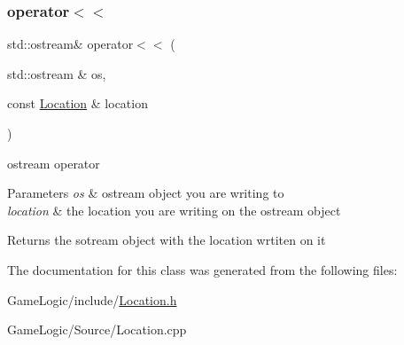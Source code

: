 \subsubsection{\texorpdfstring{operator$<$$<$}{operator<<}}
{\footnotesize\ttfamily std\+::ostream\& operator$<$$<$ (\begin{DoxyParamCaption}\item[{std\+::ostream \&}]{os,  }\item[{const \hyperlink{classroadfighter_1_1Location}{Location} \&}]{location }\end{DoxyParamCaption})\hspace{0.3cm}{\ttfamily [friend]}}

ostream operator 
\begin{DoxyParams}{Parameters}
{\em os} & ostream object you are writing to \\
\hline
{\em location} & the location you are writing on the ostream object \\
\hline
\end{DoxyParams}
\begin{DoxyReturn}{Returns}
the sotream object with the location wrtiten on it 
\end{DoxyReturn}


The documentation for this class was generated from the following files\+:\begin{DoxyCompactItemize}
\item 
Game\+Logic/include/\hyperlink{Location_8h}{Location.\+h}\item 
Game\+Logic/\+Source/Location.\+cpp\end{DoxyCompactItemize}
